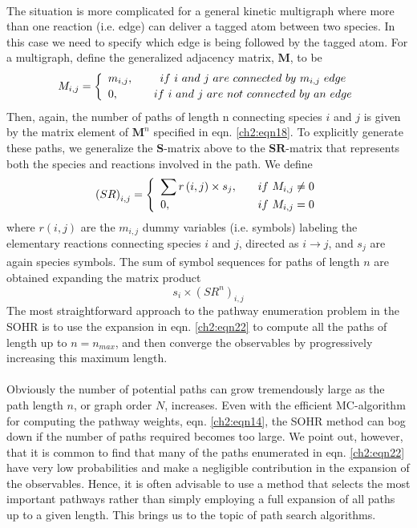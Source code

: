 \paragraph{}
The situation is more complicated for a general kinetic multigraph where more than
one reaction (i.e. edge) can deliver a tagged atom between two species. In this case we
need to specify which edge is being followed by the tagged atom. For a multigraph,
define the generalized adjacency matrix, $\mathbf{M}$, to be
\begin{eqnarray}
  M_{i,j} = \twochoices
	{m_{i,j}, && if ~i ~and ~j ~are ~connected ~by ~m_{i,j} ~edge}
	{0, && if ~i ~and ~j ~are ~not ~connected ~by ~an ~edge}
\label{ch2:eqn20}
\end{eqnarray}
Then, again, the number of paths of length n connecting species $i$ and $j$ is given by the
matrix element of ${\mathbf{M}}^n$ specified in eqn. \ref{ch2:eqn18}. To explicitly generate these paths, we generalize the $\mathbf{S}$-matrix above to the $\mathbf{SR}$-matrix that represents both the species and
reactions involved in the path. We define
\begin{eqnarray}
  {\left(  SR \right)}_{i,j} = \twochoices
	{\sum{r \left( i,j \right) \times s_j}, && if ~M_{i,j} \neq 0}
	{0, && if ~M_{i,j} = 0}
\label{ch2:eqn21}
\end{eqnarray}
where $r \left( i,j \right)$ are the $m_{i,j}$ dummy variables (i.e. symbols) labeling the elementary reactions
connecting species $i$ and $j$, directed as $i \xrightarrow[]{} j$, and $s_j$ are again species symbols.
The sum of symbol sequences for paths of length $n$ are obtained expanding the matrix
product
\begin{equation}
\label{ch2:eqn22}
s_i \times {\left(  {SR}^n \right)}_{i,j}
\end{equation}
The most straightforward approach to the pathway enumeration problem in the SOHR is
to use the expansion in eqn. \ref{ch2:eqn22} to compute all the paths of length up to $n = n_{max}$,
and then converge the observables by progressively increasing this maximum length.
\newline
\paragraph{}
Obviously the number of potential paths can grow tremendously large as the path
length $n$, or graph order $N$, increases. Even with the efficient MC-algorithm for computing
the pathway weights, eqn. \ref{ch2:eqn14}, the SOHR method can bog down if the number
of paths required becomes too large. We point out, however, that it is common to
find that many of the paths enumerated in eqn. \ref{ch2:eqn22} have very low probabilities
and make a negligible contribution in the expansion of the observables. Hence, it is
often advisable to use a method that selects the most important pathways rather than
simply employing a full expansion of all paths up to a given length. This brings us to
the topic of path search algorithms.
\newline
